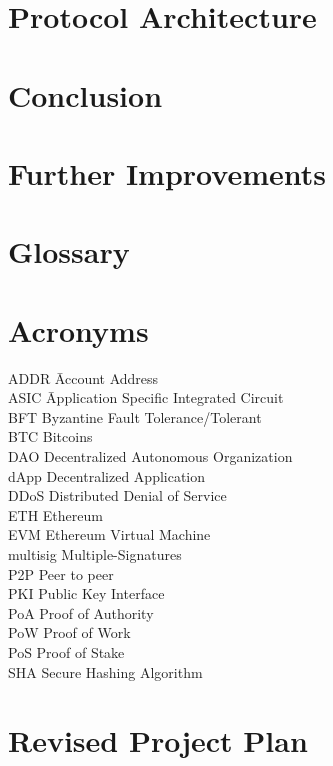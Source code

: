 \documentclass[a4paper,twoside,phd]{BYUPhys}
\begin{document}
\chapter{Protocol Architecture}
\chapter{Conclusion}
\chapter{Further Improvements}
\chapter{Glossary}
\chapter{Acronyms}
\label{chap:abbreviations}

\begin{tabbing}

ADDR \qquad \qquad \= Account Address\\
ASIC \qquad \qquad \= Application Specific Integrated Circuit\\
BFT \> Byzantine Fault Tolerance/Tolerant\\
BTC \> Bitcoins\\
DAO \> Decentralized Autonomous Organization\\
dApp \> Decentralized Application\\
DDoS \> Distributed Denial of Service\\
ETH \> Ethereum\\
EVM \> Ethereum Virtual Machine\\
multisig \> Multiple-Signatures\\
P2P \> Peer to peer\\
PKI \>Public Key Interface\\
PoA \> Proof of Authority\\
PoW \> Proof of Work\\
PoS \> Proof of Stake\\
SHA \> Secure Hashing Algorithm\\
\end{tabbing}



\appendix
\chapter{Revised Project Plan}
\end{document}
